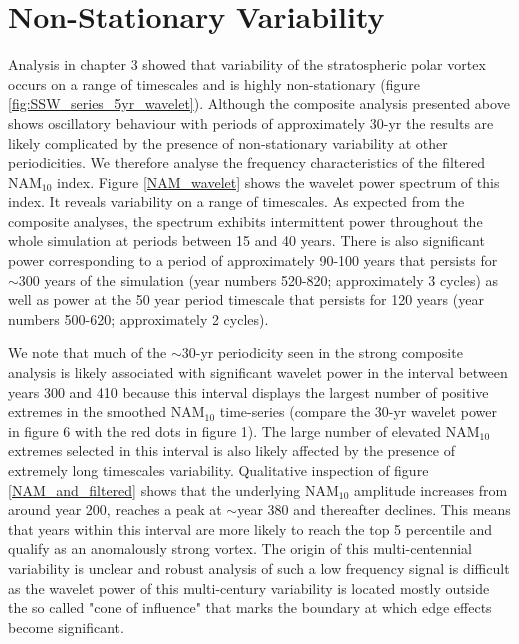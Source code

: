 \section{Non-Stationary Variability}
Analysis in chapter 3 showed that variability of the stratospheric polar vortex  occurs on a range of timescales and is highly non-stationary  (figure \ref{fig:SSW_series_5yr_wavelet}). Although the composite analysis presented above shows oscillatory behaviour with periods of approximately 30-yr the results are likely complicated by the presence of  non-stationary variability at other periodicities.  We therefore analyse the frequency characteristics of the filtered NAM$_{10}$ index. Figure \ref{NAM_wavelet} shows the wavelet power spectrum of this index. It reveals variability on a range of timescales. As expected from the composite analyses, the spectrum exhibits intermittent power throughout the whole simulation at periods between 15 and 40 years. There is also significant power   corresponding to a period of approximately 90-100 years that persists for $\sim$300 years of the simulation (year numbers 520-820; approximately 3 cycles) as well as power at the 50 year period timescale that persists for 120 years (year numbers 500-620; approximately 2 cycles). 

We note that much of the $\sim$30-yr periodicity seen in the strong composite analysis is likely associated with significant wavelet power in the interval between years 300 and 410 because this interval displays the largest number of positive extremes in the smoothed NAM$_{10}$ time-series (compare the 30-yr wavelet power in figure 6 with  the red dots in figure 1). The large number of elevated NAM$_{10}$ extremes selected in this interval is also likely affected by the presence of extremely long timescales variability. Qualitative inspection of figure \ref{NAM_and_filtered} shows that the underlying NAM$_{10}$ amplitude increases from around year 200, reaches a peak at $\sim$year 380 and thereafter declines. This means that years within this interval are more likely to reach the top 5 percentile and qualify as an anomalously strong vortex. The origin of this multi-centennial variability is unclear and robust analysis of such a low frequency signal is difficult as the wavelet power of this multi-century variability is located mostly outside the so called "cone of influence" that marks the boundary at which edge effects become significant. 

